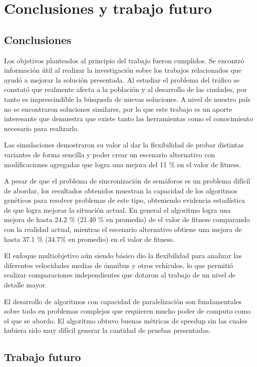 \chapter{Conclusiones y trabajo futuro}

\section{Conclusiones}
Los objetivos planteados al principio del trabajo fueron cumplidos.
Se encontró información útil al realizar la investigación sobre los trabajos relacionados que ayudó a mejorar la solución presentada. 
Al estudiar el problema del tráfico se constató que realmente afecta a la población y al desarrollo de las ciudades, por tanto es imprescindible la búsqueda de nuevas soluciones. A nivel de nuestro país no se encontraron soluciones similares, por lo que este trabajo es un aporte interesante que demuestra que existe tanto las herramientas como el conocimiento necesario para realizarlo.
 
Las simulaciones demostraron su valor al dar la flexibilidad de probar distintas variantes de forma sencilla y poder crear un escenario alternativo con modificaciones agregadas que logra una mejora del 11 \% en el valor de fitness.
 
A pesar de que el problema de sincronización de semáforos es un problema difícil de abordar, los resultados obtenidos muestran la capacidad de los algoritmos genéticos para resolver problemas de este tipo, obteniendo evidencia estadística de que logra mejorar la situación actual. En general el algoritmo logra una mejora de hasta  24.2 \% (21.40 \% en promedio) de el valor de fitness comparando con la realidad actual, mientras el escenario alternativo obtiene una mejora de hasta 37.1 \% (34.7\% en promedio) en el valor de fitness.

El enfoque multiobjetivo aún siendo básico dio la flexibilidad para analizar las diferentes velocidades medias de ómnibus y otros vehículos, lo que permitió realizar comparaciones independientes que dotaron al trabajo de un nivel de detalle mayor.

El desarrollo de algoritmos con capacidad de paralelización son fundamentales sobre  todo en problemas complejos que requieren mucho poder de computo como el que se abordo. El algoritmo obtuvo buenas métricas de speedup sin las cuales hubiera sido muy difícil generar la cantidad de pruebas presentadas.

\section{Trabajo futuro}

